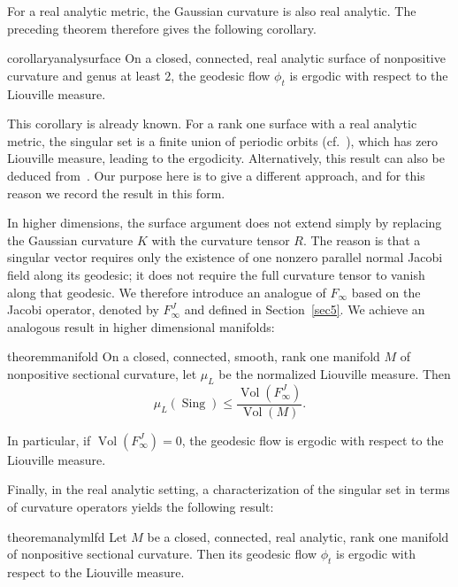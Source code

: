 \documentclass[reqno,11pt]{article}
\theoremstyle{definition}
\theoremstyle{remark}
\numberwithin{equation}{section}
\DeclareMathOperator{\vol}{Vol}
\DeclareMathOperator{\sing}{Sing}
\begin{document}
For a real analytic metric, the Gaussian curvature is also real analytic. The preceding theorem therefore gives the following corollary.

\begin{restatable}{corollary}{analysurface}\label{cor_2_1}
	On a closed, connected, real analytic surface of nonpositive curvature and genus at least $2$, the geodesic flow $\phi_t$ is ergodic with respect to the Liouville measure.
\end{restatable}

This corollary is already known. For a rank one surface with a real analytic metric, the singular set is a finite union of periodic orbits (cf.~\cites[Section~10.1]{BurnsClimenhagaFisherThompson2018}[Section~14]{Hasselblatt2007}), which has zero Liouville measure, leading to the ergodicity. Alternatively, this result can also be deduced from~\cite[Theorems~1.3 and~1.6]{Wu2015}. Our purpose here is to give a different approach, and for this reason we record the result in this form.

In higher dimensions, the surface argument does not extend simply by replacing the Gaussian curvature $K$ with the curvature tensor $R$. The reason is that a singular vector requires only the existence of one nonzero parallel normal Jacobi field along its geodesic; it does not require the full curvature tensor to vanish along that geodesic. We therefore introduce an analogue of $F_{\infty}$ based on the Jacobi operator, denoted by $F_{\infty}^{J}$ and defined in Section~\ref{sec5}. We achieve an analogous result in higher dimensional manifolds:

\begin{restatable}{theorem}{manifold}\label{thm_2_4}
	On a closed, connected, smooth, rank one manifold $M$ of nonpositive sectional curvature, let $\mu_L$ be the normalized Liouville measure. Then
	\begin{displaymath}
		\mu_{L}(\sing)\leq \dfrac{\vol(F^{J}_{\infty})}{\vol(M)}.
	\end{displaymath}

	In particular, if $\vol(F^{J}_{\infty})=0$, the geodesic flow is ergodic with respect to the Liouville measure.
\end{restatable}

Finally, in the real analytic setting, a characterization of the singular set in terms of curvature operators yields the following result:

\begin{restatable}{theorem}{analymlfd}\label{thm_2_5}
	Let $M$ be a closed, connected, real analytic, rank one manifold of nonpositive sectional curvature. Then its geodesic flow $\phi_t$ is ergodic with respect to the Liouville measure.
\end{restatable}
\end{document}
